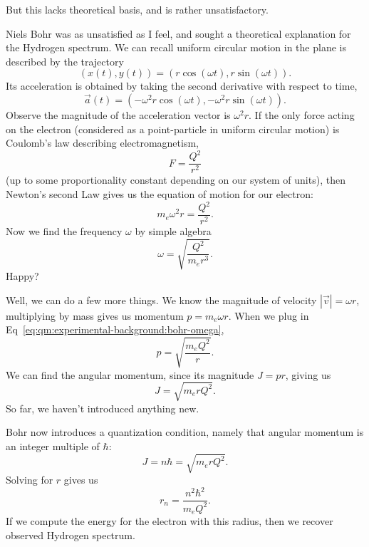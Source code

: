 But this lacks theoretical basis, and is rather unsatisfactory.

Niels Bohr was as unsatisfied as I feel, and sought a theoretical
explanation for the Hydrogen spectrum. We can recall uniform circular
motion in the plane is described by the trajectory
\begin{equation}
(x(t),y(t)) = (r\cos(\omega t), r\sin(\omega t)).
\end{equation}
Its acceleration is obtained by taking the second derivative with
respect to time,
\begin{equation}
\vec{a}(t) = (-\omega^{2}r\cos(\omega t), -\omega^{2}r\sin(\omega t)).
\end{equation}
Observe the magnitude of the acceleration vector is $\omega^{2}r$. If
the only force acting on the electron (considered as a point-particle in
uniform circular motion) is Coulomb's law describing electromagnetism,
\begin{equation}
F = \frac{Q^{2}}{r^{2}}
\end{equation}
(up to some proportionality constant depending on our system of units),
then Newton's second Law gives us the equation of motion for our electron:
\begin{equation}
m_{e}\omega^{2}r = \frac{Q^{2}}{r^{2}}.
\end{equation}
Now we find the frequency $\omega$ by simple algebra
\begin{equation}\label{eq:qm:experimental-background:bohr-omega}
\omega = \sqrt{\frac{Q^{2}}{m_{e}r^{3}}}.
\end{equation}
Happy?

Well, we can do a few more things. We know the magnitude of velocity
$|\vec{v}|=\omega r$, multiplying by mass gives us momentum
$p=m_{e}\omega r$. When we plug in
Eq~\eqref{eq:qm:experimental-background:bohr-omega},
\begin{equation}\label{eq:qm:experimental-background:bohr:momenta}
p = \sqrt{\frac{m_{e}Q^{2}}{r}}.
\end{equation}
We can find the angular momentum, since its magnitude $J=pr$, giving us
\begin{equation}
J = \sqrt{m_{e}rQ^{2}}.
\end{equation}
So far, we haven't introduced anything new.

Bohr now introduces a quantization condition, namely that angular
momentum is an integer multiple of $\hbar$:
\begin{equation}
J = n\hbar = \sqrt{m_{e}rQ^{2}}.
\end{equation}
Solving for $r$ gives us
\begin{equation}
r_{n} = \frac{n^{2}\hbar^{2}}{m_{e}Q^{2}}.
\end{equation}
If we compute the energy for the electron with this radius, then we
recover observed Hydrogen spectrum.

